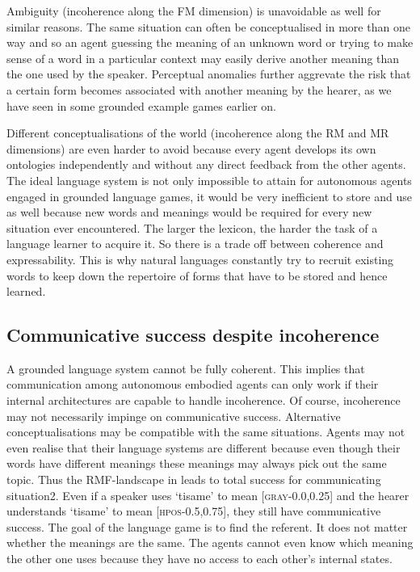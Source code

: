 Ambiguity (incoherence along the FM dimension) 
is unavoidable as well for similar reasons. 
The same situation can often be conceptualised in more than 
one way and so an agent guessing the meaning of an unknown 
word or trying to make sense of a word in a particular 
context may easily derive another meaning than the one 
used by the speaker. Perceptual anomalies further aggrevate
the risk that a certain form becomes associated with 
another meaning by the hearer, as we have seen in some
grounded example games earlier on. 

Different conceptualisations of the world (incoherence 
along the RM and MR dimensions) are even harder to 
avoid because every agent develops its own 
ontologies independently and without any direct 
feedback from the other agents. 
The ideal language system is not only impossible to 
attain for autonomous agents engaged in grounded
language games, it would be very 
inefficient to store and use as well because 
new words and meanings would be required for every new 
situation ever encountered. The larger the lexicon,
the harder the task of a language learner to acquire it. 
So there is a trade off between coherence and expressability. 
This is why natural languages constantly try to recruit existing 
words to keep down the repertoire of \enlargethispage{2\baselineskip} 
forms that have to be stored and hence learned.

\subsection{Communicative success despite incoherence}

A grounded language system cannot be fully coherent. 
This implies that communication among autonomous 
embodied agents can only work if their internal 
architectures are capable to handle incoherence. 
Of course, incoherence may not necessarily 
impinge on communicative success. 
Alternative conceptualisations may 
be compatible with the same situations. Agents may not
even realise that their language systems are different
because even though their words have different 
meanings these meanings may always pick out the 
same topic. Thus 
the RMF-landscape in  leads to total
success for communicating situation2. Even if 
a speaker uses `tisame' to mean [\textsc{gray}-0.0,0.25] and the hearer
understands `tisame' to mean [\textsc{hpos}-0.5,0.75], they 
still have communicative success. The goal 
of the language game is to find the referent. It does
not matter whether the meanings are the same. The agents
cannot even know which meaning the other one uses
because they have no access to each other's internal states. 

